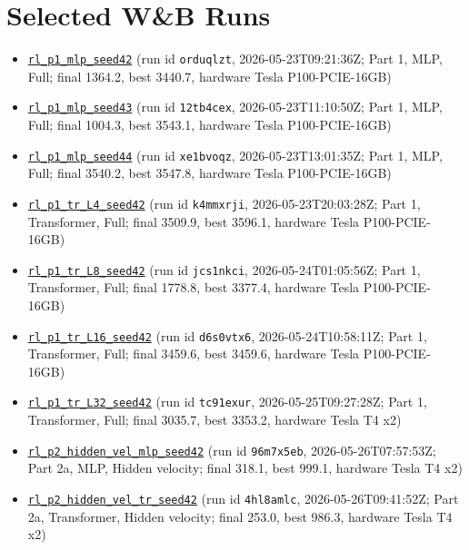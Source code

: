 \documentclass[11pt]{article}
\begin{document}
\appendix
\section{Selected W\&B Runs}
\footnotesize
\begin{itemize}
\item \href{https://wandb.ai/krishsachdev246-bits-pilani/saidl-rl/runs/orduqlzt}{\texttt{rl\_p1\_mlp\_seed42}} (run id \texttt{orduqlzt}, 2026-05-23T09:21:36Z; Part 1, MLP, Full; final 1364.2, best 3440.7, hardware Tesla P100-PCIE-16GB)
\item \href{https://wandb.ai/krishsachdev246-bits-pilani/saidl-rl/runs/12tb4cex}{\texttt{rl\_p1\_mlp\_seed43}} (run id \texttt{12tb4cex}, 2026-05-23T11:10:50Z; Part 1, MLP, Full; final 1004.3, best 3543.1, hardware Tesla P100-PCIE-16GB)
\item \href{https://wandb.ai/krishsachdev246-bits-pilani/saidl-rl/runs/xe1bvoqz}{\texttt{rl\_p1\_mlp\_seed44}} (run id \texttt{xe1bvoqz}, 2026-05-23T13:01:35Z; Part 1, MLP, Full; final 3540.2, best 3547.8, hardware Tesla P100-PCIE-16GB)
\item \href{https://wandb.ai/krishsachdev246-bits-pilani/saidl-rl/runs/k4mmxrji}{\texttt{rl\_p1\_tr\_L4\_seed42}} (run id \texttt{k4mmxrji}, 2026-05-23T20:03:28Z; Part 1, Transformer, Full; final 3509.9, best 3596.1, hardware Tesla P100-PCIE-16GB)
\item \href{https://wandb.ai/krishsachdev246-bits-pilani/saidl-rl/runs/jcs1nkci}{\texttt{rl\_p1\_tr\_L8\_seed42}} (run id \texttt{jcs1nkci}, 2026-05-24T01:05:56Z; Part 1, Transformer, Full; final 1778.8, best 3377.4, hardware Tesla P100-PCIE-16GB)
\item \href{https://wandb.ai/krishsachdev246-bits-pilani/saidl-rl/runs/d6s0vtx6}{\texttt{rl\_p1\_tr\_L16\_seed42}} (run id \texttt{d6s0vtx6}, 2026-05-24T10:58:11Z; Part 1, Transformer, Full; final 3459.6, best 3459.6, hardware Tesla P100-PCIE-16GB)
\item \href{https://wandb.ai/krishsachdev246-bits-pilani/saidl-rl/runs/tc91exur}{\texttt{rl\_p1\_tr\_L32\_seed42}} (run id \texttt{tc91exur}, 2026-05-25T09:27:28Z; Part 1, Transformer, Full; final 3035.7, best 3353.2, hardware Tesla T4 x2)
\item \href{https://wandb.ai/krishsachdev246-bits-pilani/saidl-rl/runs/96m7x5eb}{\texttt{rl\_p2\_hidden\_vel\_mlp\_seed42}} (run id \texttt{96m7x5eb}, 2026-05-26T07:57:53Z; Part 2a, MLP, Hidden velocity; final 318.1, best 999.1, hardware Tesla T4 x2)
\item \href{https://wandb.ai/krishsachdev246-bits-pilani/saidl-rl/runs/4hl8amlc}{\texttt{rl\_p2\_hidden\_vel\_tr\_seed42}} (run id \texttt{4hl8amlc}, 2026-05-26T09:41:52Z; Part 2a, Transformer, Hidden velocity; final 253.0, best 986.3, hardware Tesla T4 x2)

\end{itemize}
\end{document}
